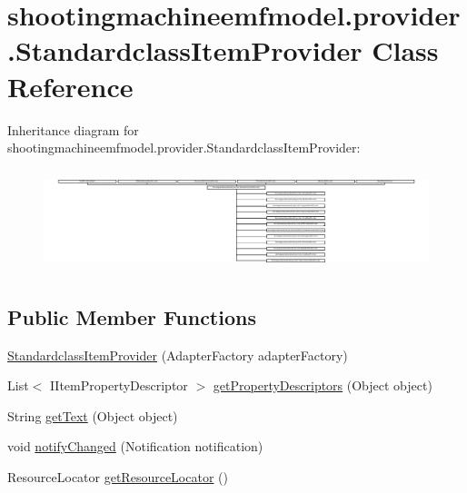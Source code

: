 \hypertarget{classshootingmachineemfmodel_1_1provider_1_1_standardclass_item_provider}{\section{shootingmachineemfmodel.\-provider.\-Standardclass\-Item\-Provider Class Reference}
\label{classshootingmachineemfmodel_1_1provider_1_1_standardclass_item_provider}
}
Inheritance diagram for shootingmachineemfmodel.\-provider.\-Standardclass\-Item\-Provider\-:\begin{figure}[H]
\begin{center}
\leavevmode
\includegraphics[height=3.017706cm]{classshootingmachineemfmodel_1_1provider_1_1_standardclass_item_provider}
\end{center}
\end{figure}
\subsection*{Public Member Functions}
\begin{DoxyCompactItemize}
\item 
\hyperlink{classshootingmachineemfmodel_1_1provider_1_1_standardclass_item_provider_a322e3ef3b734524c152381c4f6f3dc58}{Standardclass\-Item\-Provider} (Adapter\-Factory adapter\-Factory)
\item 
List$<$ I\-Item\-Property\-Descriptor $>$ \hyperlink{classshootingmachineemfmodel_1_1provider_1_1_standardclass_item_provider_a5ee905f8c0b4f7b3e2d5dd6122dd945a}{get\-Property\-Descriptors} (Object object)
\item 
String \hyperlink{classshootingmachineemfmodel_1_1provider_1_1_standardclass_item_provider_aadf28edb9e76803c73bccae00899df73}{get\-Text} (Object object)
\item 
void \hyperlink{classshootingmachineemfmodel_1_1provider_1_1_standardclass_item_provider_abd2c65620937e3e802df5586496fd0aa}{notify\-Changed} (Notification notification)
\item 
Resource\-Locator \hyperlink{classshootingmachineemfmodel_1_1provider_1_1_standardclass_item_provider_a867a554d7fc9b07373b16c80685f5dcd}{get\-Resource\-Locator} ()
\end{DoxyCompactItemize}
